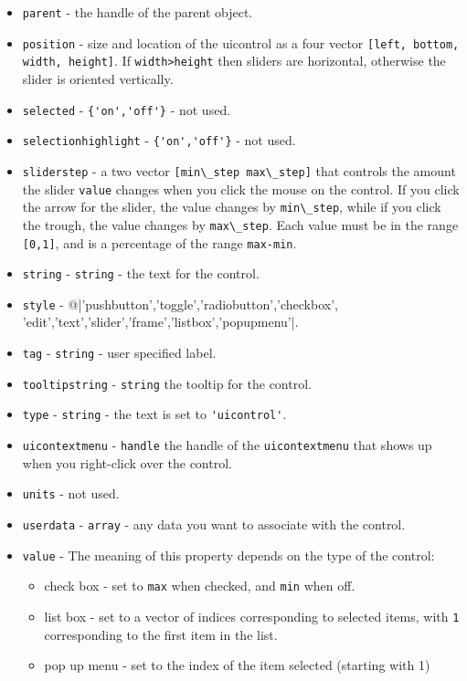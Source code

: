 \begin{itemize}
\begin{itemize}
\end{itemize}
\item \verb|parent| - the handle of the parent object.
\item \verb|position| - size and location of the uicontrol as a 
four vector \verb|[left, bottom, width, height]|.  If \verb|width>height|
then sliders are horizontal, otherwise the slider is oriented
vertically.
\item \verb|selected| - \verb|{'on','off'}| - not used.
\item \verb|selectionhighlight| - \verb|{'on','off'}| - not used.
\item \verb|sliderstep| - a two vector \verb|[min\_step max\_step]|
that controls the amount the slider \verb|value| changes when
you click the mouse on the control.  If you click the arrow
for the slider, the value changes by \verb|min\_step|, while if
you click the trough, the value changes by \verb|max\_step|.  
Each value must be in the range \verb|[0,1]|, and is a percentage
of the range \verb|max-min|.
\item \verb|string| - \verb|string| - the text for the control.
\item \verb|style| - @|{'pushbutton','toggle','radiobutton','checkbox',
'edit','text','slider','frame','listbox','popupmenu'}|.
\item \verb|tag| - \verb|string| - user specified label.
\item \verb|tooltipstring| - \verb|string| the tooltip for the control.
\item \verb|type| - \verb|string| - the text is set to \verb|'uicontrol'|.
\item \verb|uicontextmenu| - \verb|handle| the handle of the \verb|uicontextmenu|
that shows up when you right-click over the control.
\item \verb|units| - not used.
\item \verb|userdata| - \verb|array| - any data you want to associate with the
control.
\item \verb|value| - The meaning of this property depends on the type of the
control:
\begin{itemize}
\item  check box - set to \verb|max| when checked, and \verb|min| when off.

\item  list box - set to a vector of indices corresponding to selected
items, with \verb|1| corresponding to the first item in the list.

\item  pop up menu - set to the index of the item selected (starting with 1)


\end{itemize}
\end{itemize}
